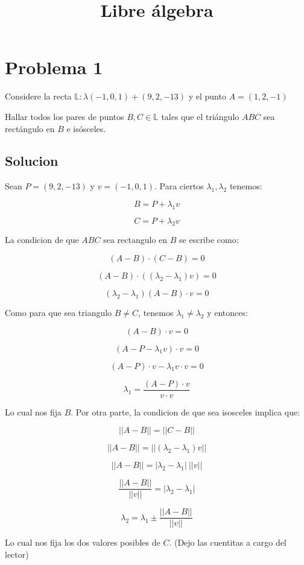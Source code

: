 \documentclass{article}
\title{Libre álgebra}
\author{}
\date{}
\begin{document}
\maketitle

\section{Problema 1}

Considere la recta $\mathbb{L} : \lambda (-1,0,1) + (9,2,-13)$ y el punto $A = (1,2,-1)$

Hallar todos los pares de puntos $B,C \in \mathbb{L}$ tales que el triángulo $ABC$ sea rectángulo en $B$ e isósceles.

\subsection{Solucion}

Sean $P = (9,2,-13)$ y $v = (-1,0,1)$. Para ciertos $\lambda_1,\lambda_2$ tenemos:

$$B = P + \lambda_1 v$$

$$C = P + \lambda_2 v$$

La condicion de que $ABC$ sea rectangulo en $B$ se escribe como:

$$(A-B)\cdot(C-B) = 0$$

$$(A-B)\cdot((\lambda_2-\lambda_1) v) = 0$$

$$(\lambda_2-\lambda_1) (A-B)\cdot v = 0$$

Como para que sea triangulo $B \neq C$, tenemos $\lambda_1 \neq \lambda_2$ y entonces:

$$(A-B) \cdot v = 0$$

$$(A-P - \lambda_1 v) \cdot v = 0$$

$$(A-P) \cdot v - \lambda_1 v \cdot v = 0$$

$$\lambda_1 = \frac{(A-P) \cdot v}{v \cdot v}$$

Lo cual nos fija $B$. Por otra parte, la condicion de que sea isosceles implica que:

$$||A-B|| = ||C-B||$$

$$||A-B|| = ||(\lambda_2-\lambda_1) v||$$

$$||A-B|| = |\lambda_2-\lambda_1|\ ||v||$$

$$\frac{||A-B||}{||v||} = |\lambda_2-\lambda_1|$$

$$\lambda_2 = \lambda_1 \pm \frac{||A-B||}{||v||}$$

Lo cual nos fija los dos valores posibles de $C$. (Dejo las cuentitas a cargo del lector)
\end{document}
